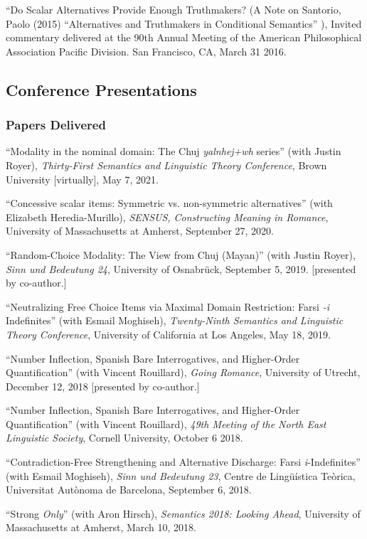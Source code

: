 \documentclass[11pt]{article}
\begin{document}
``Do Scalar Alternatives Provide Enough Truthmakers? (A Note on Santorio, Paolo (2015) ``Alternatives and Truthmakers in Conditional Semantics'' ), Invited commentary delivered at the 90th Annual Meeting of the American Philosophical Association Pacific Division. San Francisco, CA, March 31 2016. 


\subsection*{Conference Presentations}


\subsubsection*{Papers Delivered}

``Modality in the nominal domain: The Chuj \textit{yalnhej+wh} series'' (with Justin Royer), \textit{Thirty-First Semantics and Linguistic Theory Conference}, Brown University [virtually], May 7, 2021.

``Concessive scalar items: Symmetric vs. non-symmetric alternatives'' (with Elizabeth Heredia-Murillo), \textit{SENSUS, Constructing Meaning in Romance}, University of Massachusetts at Amherst, September 27, 2020.

``Random-Choice Modality: The View from Chuj (Mayan)'' (with Justin Royer), \textit{Sinn und Bedeutung 24}, University of Osnabr\"{u}ck, September 5, 2019. [presented by co-author.]

``Neutralizing Free Choice Items via Maximal Domain Restriction: Farsi \textit{-i} Indefinites'' (with Esmail Moghiseh), \textit{Twenty-Ninth Semantics and Linguistic Theory Conference}, University of California at Los Angeles, May 18, 2019.

``Number Inflection, Spanish Bare Interrogatives, and Higher-Order Quantification'' (with Vincent Rouillard), \textit{Going Romance}, University of Utrecht, December 12, 2018 [presented by co-author.]

``Number Inflection, Spanish Bare Interrogatives, and Higher-Order Quantification'' (with Vincent Rouillard), \textit{49th
  Meeting of the North East Linguistic Society}, Cornell University, October 6 2018.

``Contradiction-Free Strengthening and Alternative Discharge: Farsi \textit{i}-Indefinites'' (with Esmail Moghiseh), \textit{Sinn und Bedeutung 23}, Centre de Ling\"{u}\'istica Te\`orica, Universitat Aut\`onoma de Barcelona, September 6, 2018.
 
``Strong \textit{Only}'' (with Aron Hirsch), \textit{Semantics 2018: Looking Ahead}, University of Massachusetts at Amherst, March 10, 2018.
 
\end{document}
